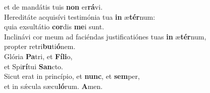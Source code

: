 \evenverse et de mandátis tuis \textbf{non} er\textbf{rá}vi.\\
\oddverse Hereditáte acquisívi testimónia tua \textbf{in} æ\textbf{tér}num:~\*\\
\oddverse quia exsultátio \textbf{cor}dis \textbf{me}i sunt.\\
\evenverse Inclinávi cor meum ad faciéndas justificatiónes tuas \textbf{in} æ\textbf{tér}num,~\*\\
\evenverse propter retri\textbf{bu}ti\textbf{ó}nem.\\
\oddverse Glória \textbf{Pa}tri, et \textbf{Fí}\textbf{li}o,~\*\\
\oddverse et Spi\textbf{rí}tui \textbf{San}cto.\\
\evenverse Sicut erat in princípio, et \textbf{nunc}, et \textbf{sem}per,~\*\\
\evenverse et in sǽcula sæcu\textbf{ló}rum. \textbf{A}men.\\
